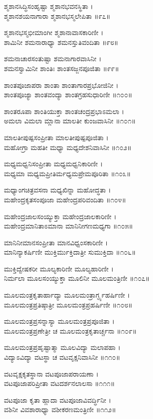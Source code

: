 ಶ್ಮಶಾನಸಿದ್ಧಿಸಂಹೃಷ್ಟಾ ಶ್ಮಶಾನಭವನಸ್ಥಿತಾ ।\\
ಶ್ಮಶಾನಶಯನಾಗಾರಾ ಶ್ಮಶಾನಭಸ್ಮಲೇಪಿತಾ ॥೯೭॥

ಶ್ಮಶಾನಭಸ್ಮಭೀಮಾಂಗೀ ಶ್ಮಶಾನಾವಾಸಕಾರಿಣೀ ।\\
ಶಾಮಿನೀ ಶಮನಾರಾಧ್ಯಾ ಶಮನಸ್ತುತಿವಂದಿತಾ ॥೯೮॥

ಶಮನಾಚಾರಸಂತುಷ್ಟಾ ಶಮನಾಗಾರವಾಸಿನೀ ।\\
ಶಮನಸ್ವಾಮಿನೀ ಶಾಂತಿಃ ಶಾಂತಸಜ್ಜನಪೂಜಿತಾ ॥೯೯॥

ಶಾಂತಪೂಜಾಪರಾ ಶಾಂತಾ ಶಾಂತಾಗಾರಪ್ರಭೋಜಿನೀ ।\\
ಶಾಂತಪೂಜ್ಯಾ ಶಾಂತವಂದ್ಯಾ ಶಾಂತಗ್ರಹಸುಧಾರಿಣೀ ॥೧೦೦॥

ಶಾಂತರೂಪಾ ಶಾಂತಿಯುಕ್ತಾ ಶಾಂತಚಂದ್ರಪ್ರಭಾಽಮಲಾ ।\\
ಅಮಲಾ ವಿಮಲಾ ಮ್ಲಾನಾ ಮಾಲತೀ ಕುಂಜವಾಸಿನೀ ॥೧೦೧॥

ಮಾಲತೀಪುಷ್ಪಸಂಪ್ರೀತಾ ಮಾಲತೀಪುಷ್ಪಪೂಜಿತಾ ।\\
ಮಹೋಗ್ರಾ ಮಹತೀ ಮಧ್ಯಾ ಮಧ್ಯದೇಶನಿವಾಸಿನೀ ॥೧೦೨॥

ಮಧ್ಯಮಧ್ವನಿಸಂಪ್ರೀತಾ ಮಧ್ಯಮಧ್ವನಿಕಾರಿಣೀ ।\\
ಮಧ್ಯಮಾ ಮಧ್ಯಮಪ್ರೀತಿರ್ಮಧ್ಯಮಪ್ರೇಮಪೂರಿತಾ ॥೧೦೩॥

ಮಧ್ಯಾಂಗಚಿತ್ರವಸನಾ ಮಧ್ಯಖಿನ್ನಾ ಮಹೋದ್ಧತಾ ।\\
ಮಹೇಂದ್ರಕೃತಸಂಪೂಜಾ ಮಹೇಂದ್ರಪರಿವಂದಿತಾ ॥೧೦೪॥

ಮಹೇಂದ್ರಜಾಲಸಂಯ್ಯುಕ್ತಾ ಮಹೇಂದ್ರಜಾಲಕಾರಿಣೀ ।\\
ಮಹೇಂದ್ರಮಾನಿತಾಽಮಾನಾ ಮಾನಿನೀಗಣಮಧ್ಯಗಾ ॥೧೦೫॥

ಮಾನಿನೀಮಾನಸಂಪ್ರೀತಾ ಮಾನವಿಧ್ವಂಸಕಾರಿಣೀ ।\\
ಮಾನಿನ್ಯಾಕರ್ಷಿಣೀ ಮುಕ್ತಿರ್ಮುಕ್ತಿದಾತ್ರೀ ಸುಮುಕ್ತಿದಾ ॥೧೦೬॥

ಮುಕ್ತಿದ್ವೇಷಕರೀ ಮೂಲ್ಯಕಾರಿಣೀ ಮೂಲ್ಯಹಾರಿಣೀ ।\\
ನಿರ್ಮಲಾ ಮೂಲಸಂಯ್ಯುಕ್ತಾ ಮೂಲಿನೀ ಮೂಲಮಂತ್ರಿಣೀ ॥೧೦೭॥

ಮೂಲಮಂತ್ರಕೃತಾರ್ಹಾದ್ಯಾ ಮೂಲಮಂತ್ರಾರ್ಗ್ಘ್ಯಹರ್ಷಿಣೀ ।\\
ಮೂಲಮಂತ್ರಪ್ರತಿಷ್ಠಾತ್ರೀ ಮೂಲಮಂತ್ರಪ್ರಹರ್ಷಿಣೀ ॥೧೦೮॥

ಮೂಲಮಂತ್ರಪ್ರಸನ್ನಾಸ್ಯಾ ಮೂಲಮಂತ್ರಪ್ರಪೂಜಿತಾ ।\\
ಮೂಲಮಂತ್ರಪ್ರಣೇತ್ರೀ ಚ ಮೂಲಮಂತ್ರಕೃತಾರ್ಚ್ಚನಾ ॥೧೦೯॥

ಮೂಲಮಂತ್ರಪ್ರಹೃಷ್ಟಾತ್ಮಾ ಮೂಲವಿದ್ಯಾ ಮಲಾಪಹಾ ।\\
ವಿದ್ಯಾಽವಿದ್ಯಾ ವಟಸ್ಥಾ ಚ ವಟವೃಕ್ಷನಿವಾಸಿನೀ ॥೧೧೦॥

ವಟವೃಕ್ಷಕೃತಸ್ಥಾನಾ ವಟಪೂಜಾಪರಾಯಣಾ ।\\
ವಟಪೂಜಾಪರಿಪ್ರೀತಾ ವಟದರ್ಶನಲಾಲಸಾ ॥೧೧೧॥

ವಟಪೂಜಾ ಕೃತಾ ಹ್ಲಾದಾ ವಟಪೂಜಾವಿವರ್ದ್ಧಿನೀ ।\\
ವಶಿನೀ ವಿವಶಾರಾಧ್ಯಾ ವಶೀಕರಣಮಂತ್ರಿಣೀ ॥೧೧೨॥

